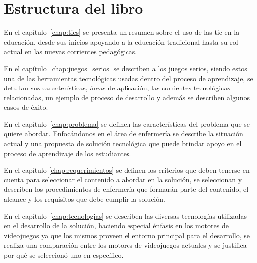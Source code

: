 \section{Estructura del libro}
    

En el capítulo~\ref{chap:tics} se presenta un resumen sobre el uso de las
\Gls{tic} en la educación, desde sus inicios apoyando a la educación tradicional
hasta su rol actual en las nuevas corrientes pedagógicas. 


En el capítulo~\ref{chap:juegos_serios} se describen a los juegos serios, siendo
estos una de las herramientas tecnológicas usadas dentro del proceso de
aprendizaje, se detallan sus características, áreas de aplicación, las
corrientes tecnológicas relacionadas, un ejemplo de proceso de desarrollo y además se 
describen algunos casos de éxito. 



En el capítulo~\ref{chap:problema} se definen las características del problema
que se quiere abordar. Enfocándonos en el
área de enfermería se describe la situación actual y una propuesta de solución
tecnológica que puede brindar apoyo en el proceso de aprendizaje de los 
estudiantes.


En el capítulo \ref{chap:requerimientos} se definen los criterios que deben
tenerse en cuenta para seleccionar el contenido a abordar en la solución, se
seleccionan y describen los procedimientos de enfermería que formarán parte del
contenido, el alcance  y los requisitos que debe cumplir la solución.


En el capítulo~\ref{chap:tecnologias} se describen las diversas tecnologías
utilizadas en el desarrollo de la solución, haciendo especial énfasis en los
motores de videojuegos ya que los mismos proveen el entorno principal para el
desarrollo, se realiza una comparación entre los motores de
videojuegos actuales y se justifica por qué se seleccionó uno en específico. 



